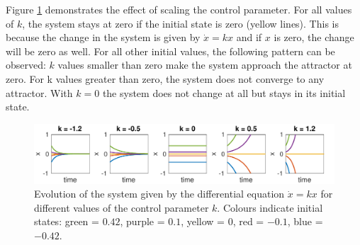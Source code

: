 Figure \ref{fig:evolution_of_straight_line2} demonstrates the effect of scaling the control parameter. For all values of $k$, the system stays at zero if the initial state is zero (yellow lines). This is because the change in the system is given by $\dot{x} = kx$ and if $x$ is zero, the change will be zero as well. For all other initial values, the following pattern can be observed: $k$ values smaller than zero make the system approach the attractor at zero. For k values greater than zero, the system does not converge to any attractor. With $k = 0$ the system does not change at all but stays in its initial state. 

\begin{figure}[htp]
\begin{center}
\captionsetup{justification=centering}
\includegraphics[width=\textwidth]{figures/ch3/evolution_of_straight_line2.pdf}
\caption[Evolution of the system given by the differential equation $\dot{x} = kx$ for different values of the control parameter $k$.]{Evolution of the system given by the differential equation $\dot{x} = kx$ for different values of the control parameter $k$. Colours indicate initial states: green = $0.42$, purple = $0.1$, yellow = $0$, red = $-0.1$, blue = $-0.42$.}
\label{fig:evolution_of_straight_line2}
\end{center}
\end{figure}

